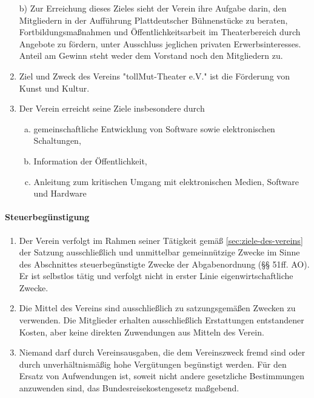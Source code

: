 \documentclass[12pt]{satzung}
\begin{document}
\begin{enumerate}[(1)]


b) Zur Erreichung dieses Zieles sieht der Verein ihre Aufgabe darin, den Mitgliedern in der Aufführung Plattdeutscher Bühnenstücke zu beraten, Fortbildungsmaßnahmen und Öffentlichkeitsarbeit im Theaterbereich durch Angebote zu fördern, unter Ausschluss jeglichen privaten Erwerbsinteresses. Anteil am Gewinn steht weder dem Vorstand noch den Mitgliedern zu.


    \item Ziel und Zweck des Vereins "tollMut-Theater e.V." ist die Förderung von Kunst und Kultur.
    \item Der Verein erreicht seine Ziele insbesondere durch
    \begin{enumerate}[a)]
      \item gemeinschaftliche Entwicklung von Software sowie
        elektronischen Schaltungen, 
      \item Information der Öffentlichkeit,
      \item Anleitung zum kritischen Umgang mit elektronischen Medien,
      Software und Hardware
    \end{enumerate}
\end{enumerate}



\paragraph{Steuerbegünstigung}
\label{sec:steuerbeguenstigung}

\begin{enumerate}[(1)]
\item Der Verein verfolgt im Rahmen seiner Tätigkeit gemäß
\ref{sec:ziele-des-vereins} der Satzung ausschließlich und unmittelbar
gemeinnützige Zwecke im Sinne des Abschnittes steuerbegünstigte Zwecke
der Abgabenordnung (§§ 51ff. AO). Er ist selbstlos tätig und verfolgt
nicht in erster Linie eigenwirtschaftliche Zwecke.

\item Die Mittel des Vereins sind ausschließlich zu
satzungsgemäßen Zwecken zu verwenden. Die Mitglieder erhalten
ausschließlich Erstattungen entstandener Kosten, aber keine direkten
Zuwendungen aus Mitteln des Verein.

\item Niemand darf durch Vereinsausgaben, die dem
Vereinszweck fremd sind oder durch unverhältnismäßig hohe Vergütungen
begünstigt werden. Für den Ersatz von Aufwendungen ist, soweit nicht
andere gesetzliche Bestimmungen anzuwenden sind, das
Bundesreisekostengesetz maßgebend.
\end{enumerate}
\end{document}
